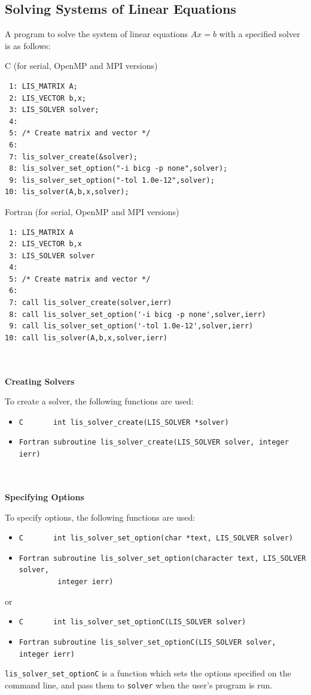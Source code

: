 \documentclass[a4paper]{article}
\begin{document}
\subsection{Solving Systems of Linear Equations}\label{subsec:solve}
A program to solve the system of linear equations $Ax = b$ with a specified 
solver is as follows: 
\begin{itembox}[l]{C (for serial, OpenMP and MPI versions)}
\small
\begin{verbatim}
 1: LIS_MATRIX A; 
 2: LIS_VECTOR b,x; 
 3: LIS_SOLVER solver; 
 4:    
 5: /* Create matrix and vector */ 
 6:    
 7: lis_solver_create(&solver); 
 8: lis_solver_set_option("-i bicg -p none",solver); 
 9: lis_solver_set_option("-tol 1.0e-12",solver); 
10: lis_solver(A,b,x,solver); 
\end{verbatim}
\end{itembox}
\begin{itembox}[l]{Fortran (for serial, OpenMP and MPI versions)}
\small
\begin{verbatim}
 1: LIS_MATRIX A 
 2: LIS_VECTOR b,x 
 3: LIS_SOLVER solver 
 4:    
 5: /* Create matrix and vector */ 
 6:    
 7: call lis_solver_create(solver,ierr) 
 8: call lis_solver_set_option('-i bicg -p none',solver,ierr) 
 9: call lis_solver_set_option('-tol 1.0e-12',solver,ierr) 
10: call lis_solver(A,b,x,solver,ierr) 
\end{verbatim}
\end{itembox}
\\ \\
\noindent
{\bf Creating Solvers}

To create a solver, the following functions are used:
\begin{itemize}
\item \verb|C       int lis_solver_create(LIS_SOLVER *solver)|
\item \verb|Fortran subroutine lis_solver_create(LIS_SOLVER solver, integer ierr) |
\end{itemize}
 \ \\ \\
\noindent
{\bf Specifying Options}

To specify options, 
the following functions are used:
\begin{itemize}
\item \verb|C       int lis_solver_set_option(char *text, LIS_SOLVER solver)|
\item \verb|Fortran subroutine lis_solver_set_option(character text, LIS_SOLVER solver,|\\
      \verb|         integer ierr)|
\end{itemize}
or
\begin{itemize}
\item \verb|C       int lis_solver_set_optionC(LIS_SOLVER solver)|
\item \verb|Fortran subroutine lis_solver_set_optionC(LIS_SOLVER solver, integer ierr)|
\end{itemize}
\verb|lis_solver_set_optionC| is a function which sets the options specified 
on the command line, and pass them to \verb|solver| when the user's program is run. 
\end{document}
